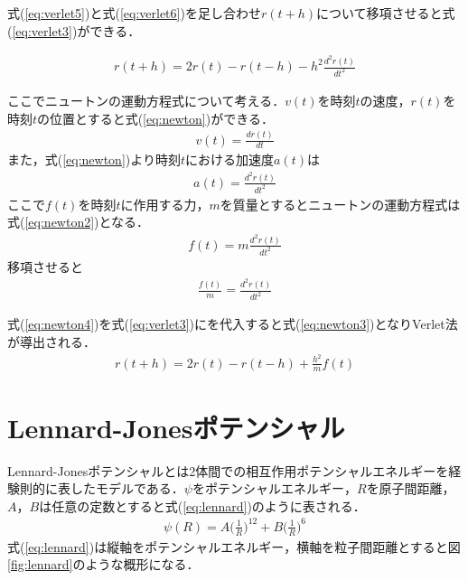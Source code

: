 式(\ref{eq:verlet5})と式(\ref{eq:verlet6})を足し合わせ$r(t+h)$について移項させると式(\ref{eq:verlet3})ができる．

\begin{eqnarray}
\label{eq:verlet3}
r(t+h)=2r(t)-r(t-h)-h^2\frac{d^2r(t)}{dt^2}
\end{eqnarray}

ここでニュートンの運動方程式について考える．$v(t)$を時刻$t$の速度，$r(t)$を時刻$t$の位置とすると式(\ref{eq:newton})ができる．
\begin{eqnarray}
\label{eq:newton}
v(t)=\frac{dr(t)}{dt}
\end{eqnarray}
また，式(\ref{eq:newton})より時刻$t$における加速度$a(t)$は
\begin{eqnarray}
a(t)=\frac{d^2r(t)}{dt^2}
\end{eqnarray}
ここで$f(t)$を時刻$t$に作用する力，$m$を質量とするとニュートンの運動方程式は式(\ref{eq:newton2})となる．
\begin{eqnarray}
\label{eq:newton2}
f(t)=m\frac{d^2r(t)}{dt^2}
\end{eqnarray}
移項させると
\begin{eqnarray}
\label{eq:newton4}
\frac{f(t)}{m}=\frac{d^2r(t)}{dt^2}
\end{eqnarray}

式(\ref{eq:newton4})を式(\ref{eq:verlet3})にを代入すると式(\ref{eq:newton3})となりVerlet法が導出される．
\begin{eqnarray}
\label{eq:newton3}
r(t+h)=2r(t)-r(t-h)+\frac{h^2}{m}f(t)
\end{eqnarray}


\section{Lennard-Jonesポテンシャル}
Lennard-Jonesポテンシャルとは2体間での相互作用ポテンシャルエネルギーを経験則的に表したモデルである\cite{akahon}．$ψ$をポテンシャルエネルギー，$R$を原子間距離，$A$，$B$は任意の定数とすると式(\ref{eq:lennard})のように表される．
\begin{eqnarray}
\label{eq:lennard}
\psi(R)=A\bigg(\frac{1}{R}\bigg)^{12}+B\bigg(\frac{1}{R}\bigg)^6
\end{eqnarray}
式(\ref{eq:lennard})は縦軸をポテンシャルエネルギー，横軸を粒子間距離とすると図\ref{fig:lennard}のような概形になる．


